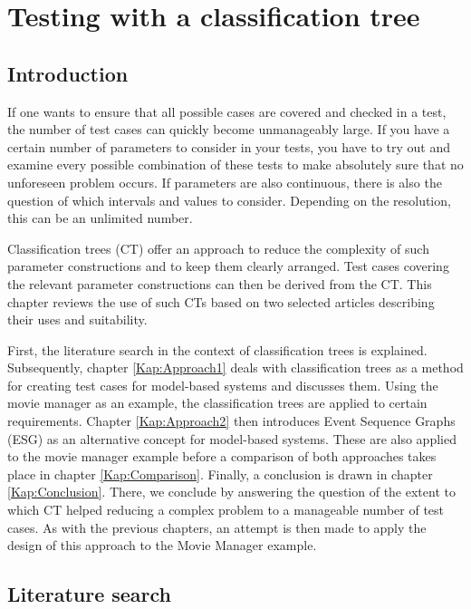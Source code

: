 \chapter{Testing with a classification tree}\label{sec:topic_5}

\section{Introduction}

If one wants to ensure that all possible cases are covered and checked in a test, the number of test cases can quickly become unmanageably large. If you have a certain number of parameters to consider in your tests, you have to try out and examine every possible combination of these tests to make absolutely sure that no unforeseen problem occurs. If parameters are also continuous, there is also the question of which intervals and values to consider. Depending on the resolution, this can be an unlimited number.

Classification trees (CT) offer an approach to reduce the complexity of such parameter constructions and to keep them clearly arranged. Test cases covering the relevant parameter constructions can then be derived from the CT. This chapter reviews the use of such CTs based on two selected articles describing their uses and suitability.

First, the literature search in the context of classification trees is explained. Subsequently, chapter \autoref{Kap:Approach1} deals with classification trees as a method for creating test cases for model-based systems and discusses them. Using the movie manager as an example, the classification trees are applied to certain requirements. Chapter \autoref{Kap:Approach2} then introduces Event Sequence Graphs (ESG) as an alternative concept for model-based systems. These are also applied to the movie manager example before a comparison of both approaches takes place in chapter \autoref{Kap:Comparison}. Finally, a conclusion is drawn in chapter \autoref{Kap:Conclusion}. There, we conclude by answering the question of the extent to which CT helped reducing a complex problem to a manageable number of test cases. As with the previous chapters, an attempt is then made to apply the design of this approach to the Movie Manager example.

\section{Literature search}


